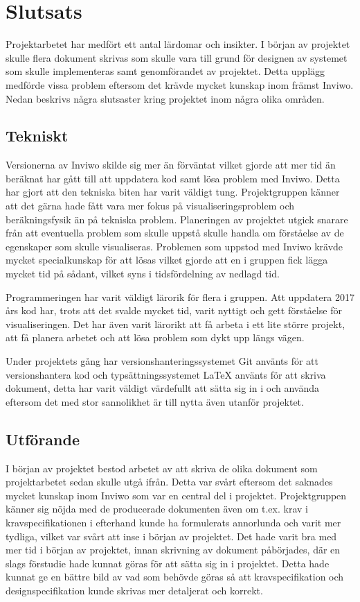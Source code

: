 \documentclass[a4paper,12pt,twoside,openright]{report}
\begin{document}
\section{Slutsats}
\label{ch:slutsats} 
Projektarbetet har medfört ett antal lärdomar och insikter. I början av projektet skulle flera dokument skrivas som skulle vara till grund för designen av systemet som skulle implementeras samt genomförandet av projektet. Detta upplägg medförde vissa problem eftersom det krävde mycket kunskap inom främst Inviwo. Nedan beskrivs några slutsaster kring projektet inom några olika områden.

\subsection{Tekniskt}
Versionerna av Inviwo skilde sig mer än förväntat vilket gjorde att
mer tid än beräknat har gått till att uppdatera kod samt lösa problem
med Inviwo. Detta har gjort att den tekniska biten har varit väldigt
tung. Projektgruppen känner att det gärna hade fått vara mer fokus på
visualiseringsproblem och beräkningsfysik än på tekniska problem.
Planeringen av projektet utgick snarare från att eventuella problem
som skulle uppstå skulle handla om förståelse av de egenskaper som
skulle visualiseras. Problemen som uppstod med Inviwo krävde mycket
specialkunskap för att lösas vilket gjorde att en i gruppen fick lägga
mycket tid på sådant, vilket syns i tidsfördelning av nedlagd tid. 

Programmeringen har varit väldigt lärorik för flera i gruppen. Att
uppdatera 2017 års kod har, trots att det svalde mycket tid, varit
nyttigt och gett förståelse för visualiseringen. Det har även varit
lärorikt att få arbeta i ett lite större projekt, att få planera
arbetet och att lösa problem som dykt upp längs vägen. 

Under projektets gång har versionshanteringssystemet Git använts för
att versionshantera kod och typsättningssystemet LaTeX använts för att
skriva dokument, detta har varit väldigt värdefullt att sätta sig in i
och använda eftersom det med stor sannolikhet är till nytta även
utanför projektet. 
\subsection{Utförande}
I början av projektet bestod arbetet av att skriva de olika dokument som projektarbetet sedan skulle utgå ifrån. Detta var svårt eftersom det saknades mycket kunskap inom Inviwo som  var en central del i projektet. Projektgruppen känner sig nöjda med de producerade dokumenten även om t.ex. krav i kravspecifikationen i efterhand kunde ha formulerats annorlunda och varit mer tydliga, vilket var svårt att inse i början av projektet. Det hade varit bra med mer tid i början av projektet, innan skrivning av dokument påbörjades, där en slags förstudie hade kunnat göras för att sätta sig in i projektet. Detta hade kunnat ge en bättre bild av vad som behövde göras så att kravspecifikation och designspecifikation kunde skrivas mer detaljerat och korrekt. 
\end{document}
